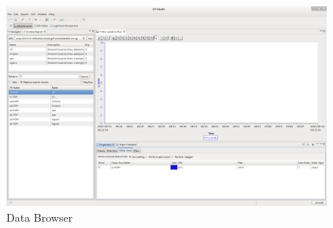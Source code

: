 \documentclass[11pt
  , a4paper
  , article
  , oneside
]{memoir}
\begin{document}
\begin{figure}[!htb]
  \centering
  \includegraphics[width=0.96\textwidth]{./images/databrowser.png}
  \caption{
            Data Browser
          }
  \label{fig:css_db}
\end{figure}

\newpage




\end{document}

